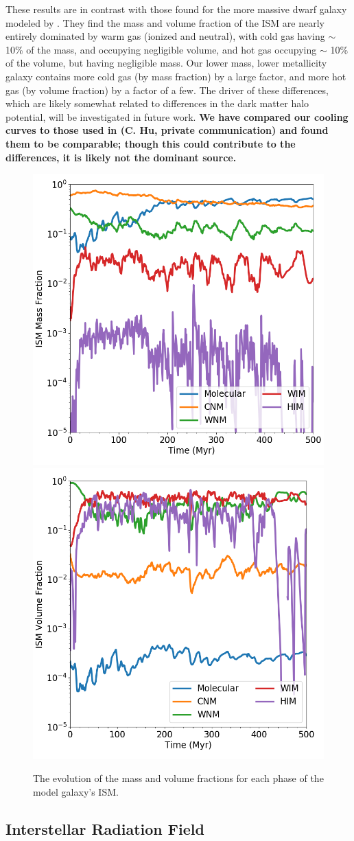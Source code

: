 \documentclass[twocolumn]{aastex61}
\begin{document}
These results are in contrast with those found for the more massive dwarf galaxy modeled by \citet{Hu2016,Hu2017}. They find the mass and volume fraction of the ISM are nearly entirely dominated by warm gas (ionized and neutral), with cold gas having $\sim$ 10\% of the mass, and occupying negligible volume, and hot gas occupying $\sim$ 10\% of the volume, but having negligible mass. Our lower mass, lower metallicity galaxy contains more cold gas (by mass fraction) by a large factor, and more hot gas (by volume fraction) by a factor of a few. The driver of these differences, which are likely somewhat related to differences in the dark matter halo potential, will be investigated in future work. {\bf We have compared our cooling curves to those used in \citep{Hu2017} (C. Hu, private communication) and found them to be comparable; though this could contribute to the differences, it is likely not the dominant source.} 

\begin{figure}
\centering
\includegraphics[width=0.45\linewidth]{phase_mass_fraction_evolution_log.png}
\includegraphics[width=0.45\linewidth]{phase_volume_fraction_evolution_log.png}
\caption{The evolution of the mass and volume fractions for each phase of the model galaxy's ISM.}
\label{fig:ISM_evolution}
\end{figure}

\subsection{Interstellar Radiation Field}
\label{sec:ISRF}
\end{document}
